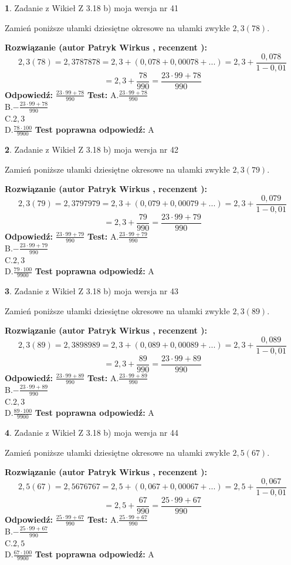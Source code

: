 \documentclass[12pt, a4paper]{article}
\theoremstyle{definition} %
\newtheorem{zad}{}
\newcommand{\zadStart}[1]{\begin{zad}#1\newline}
\newcommand{\zadStop}{\end{zad}}
\newcommand{\rozwStart}[2]{\noindent \textbf{Rozwiązanie (autor #1 , recenzent #2): }\newline}
\newcommand{\rozwStop}{\newline}
\newcommand{\odpStart}{\noindent \textbf{Odpowiedź:}\newline}
\newcommand{\odpStop}{\newline}
\newcommand{\testStart}{\noindent \textbf{Test:}\newline}
\newcommand{\testStop}{\newline}
\newcommand{\kluczStart}{\noindent \textbf{Test poprawna odpowiedź:}\newline}
\newcommand{\kluczStop}{\newline}
\begin{document}
\zadStart{Zadanie z Wikieł Z 3.18 b) moja wersja nr 41}

Zamień poniższe ułamki dziesiętne okresowe na ułamki zwykłe $2,3(78)$.
\zadStop
\rozwStart{Patryk Wirkus}{}
$$2,3(78)=2,3787878=2,3+(0,078+0,00078+...)=2,3+\frac{0,078}{1-0,01}$$
$$=2,3+\frac{78}{990}=\frac{23\cdot99+78}{990}$$
\rozwStop
\odpStart
$\frac{23\cdot99+78}{990}$
\odpStop
\testStart
A.$\frac{23\cdot99+78}{990}$\\ B.$-\frac{23\cdot99+78}{990}$\\ C.$2,3$\\ D.$\frac{78\cdot100}{9900}$
\testStop
\kluczStart
A
\kluczStop



\zadStart{Zadanie z Wikieł Z 3.18 b) moja wersja nr 42}

Zamień poniższe ułamki dziesiętne okresowe na ułamki zwykłe $2,3(79)$.
\zadStop
\rozwStart{Patryk Wirkus}{}
$$2,3(79)=2,3797979=2,3+(0,079+0,00079+...)=2,3+\frac{0,079}{1-0,01}$$
$$=2,3+\frac{79}{990}=\frac{23\cdot99+79}{990}$$
\rozwStop
\odpStart
$\frac{23\cdot99+79}{990}$
\odpStop
\testStart
A.$\frac{23\cdot99+79}{990}$\\ B.$-\frac{23\cdot99+79}{990}$\\ C.$2,3$\\ D.$\frac{79\cdot100}{9900}$
\testStop
\kluczStart
A
\kluczStop



\zadStart{Zadanie z Wikieł Z 3.18 b) moja wersja nr 43}

Zamień poniższe ułamki dziesiętne okresowe na ułamki zwykłe $2,3(89)$.
\zadStop
\rozwStart{Patryk Wirkus}{}
$$2,3(89)=2,3898989=2,3+(0,089+0,00089+...)=2,3+\frac{0,089}{1-0,01}$$
$$=2,3+\frac{89}{990}=\frac{23\cdot99+89}{990}$$
\rozwStop
\odpStart
$\frac{23\cdot99+89}{990}$
\odpStop
\testStart
A.$\frac{23\cdot99+89}{990}$\\ B.$-\frac{23\cdot99+89}{990}$\\ C.$2,3$\\ D.$\frac{89\cdot100}{9900}$
\testStop
\kluczStart
A
\kluczStop



\zadStart{Zadanie z Wikieł Z 3.18 b) moja wersja nr 44}

Zamień poniższe ułamki dziesiętne okresowe na ułamki zwykłe $2,5(67)$.
\zadStop
\rozwStart{Patryk Wirkus}{}
$$2,5(67)=2,5676767=2,5+(0,067+0,00067+...)=2,5+\frac{0,067}{1-0,01}$$
$$=2,5+\frac{67}{990}=\frac{25\cdot99+67}{990}$$
\rozwStop
\odpStart
$\frac{25\cdot99+67}{990}$
\odpStop
\testStart
A.$\frac{25\cdot99+67}{990}$\\ B.$-\frac{25\cdot99+67}{990}$\\ C.$2,5$\\ D.$\frac{67\cdot100}{9900}$
\testStop
\kluczStart
A
\kluczStop
\end{document}
